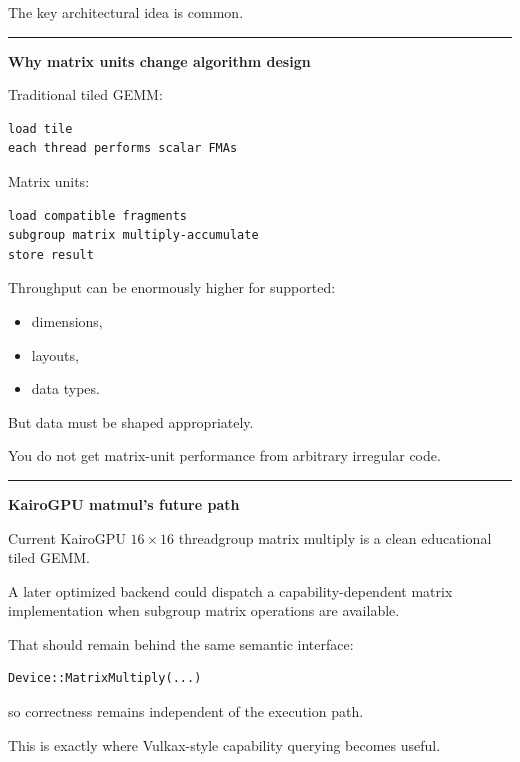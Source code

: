 The key architectural idea is common.

\begin{center}\rule{0.5\linewidth}{0.5pt}\end{center}

\textbf{Why matrix units change algorithm design}

Traditional tiled GEMM:

\protect{}\label{p10-gemm-old}%
\begin{verbatim}
load tile
each thread performs scalar FMAs
\end{verbatim}

Matrix units:

\protect{}\label{p10-gemm-matrix}%
\begin{verbatim}
load compatible fragments
subgroup matrix multiply-accumulate
store result
\end{verbatim}

Throughput can be enormously higher for supported:

\begin{itemize}
\tightlist
\item
  dimensions,
\item
  layouts,
\item
  data types.
\end{itemize}

But data must be shaped appropriately.

You do not get matrix-unit performance from arbitrary irregular code.

\begin{center}\rule{0.5\linewidth}{0.5pt}\end{center}

\textbf{KairoGPU matmul's future path}

Current KairoGPU \(16\times16\) threadgroup matrix multiply is a clean educational tiled GEMM.

A later optimized backend could dispatch a capability-dependent matrix implementation when subgroup matrix operations are available.

That should remain behind the same semantic interface:

\protect{}\label{p10-matmul-interface}%
\begin{verbatim}
Device::MatrixMultiply(...)
\end{verbatim}

so correctness remains independent of the execution path.

This is exactly where Vulkax-style capability querying becomes useful.

